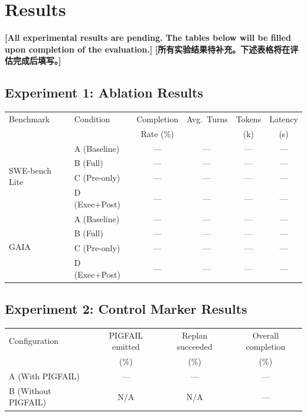 \section{Results}
\label{sec:results}

\textbf{[All experimental results are pending. The tables below will be filled upon completion of the evaluation.]}
\textbf{[所有实验结果待补充。下述表格将在评估完成后填写。]}

\subsection{Experiment 1: Ablation Results}

\begin{center}
\begin{tabular}{llcccc}
\toprule
Benchmark & Condition & Completion & Avg.\ Turns & Tokens & Latency \\
 & & Rate (\%) & & (k) & (s) \\
\midrule
\multirow{4}{*}{SWE-bench Lite} & A (Baseline) & --- & --- & --- & --- \\
 & B (Full) & --- & --- & --- & --- \\
 & C (Pre-only) & --- & --- & --- & --- \\
 & D (Exec+Post) & --- & --- & --- & --- \\
\midrule
\multirow{4}{*}{GAIA} & A (Baseline) & --- & --- & --- & --- \\
 & B (Full) & --- & --- & --- & --- \\
 & C (Pre-only) & --- & --- & --- & --- \\
 & D (Exec+Post) & --- & --- & --- & --- \\
\bottomrule
\end{tabular}
\end{center}

\subsection{Experiment 2: Control Marker Results}

\begin{center}
\begin{tabular}{lccc}
\toprule
Configuration & PIGFAIL emitted & Replan succeeded & Overall completion \\
 & (\%) & (\%) & (\%) \\
\midrule
A (With PIGFAIL) & --- & --- & --- \\
B (Without PIGFAIL) & N/A & N/A & --- \\
\bottomrule
\end{tabular}
\end{center}

